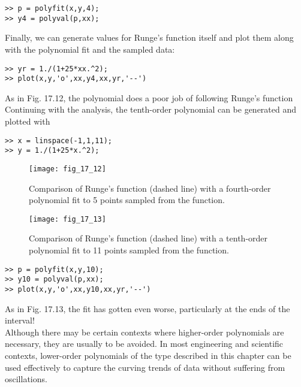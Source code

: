 \documentclass[../main.tex]{subfiles}
\begin{document}
\begin{exmp}
    \begin{lstlisting}[numbers=none]
>> p = polyfit(x,y,4);
>> y4 = polyval(p,xx);
    \end{lstlisting}
    Finally, we can generate values for Runge's function itself and plot them along with the
polynomial fit and the sampled data:
    \begin{lstlisting}[numbers=none]
>> yr = 1./(1+25*xx.^2);
>> plot(x,y,'o',xx,y4,xx,yr,'--')
    \end{lstlisting}
    As in Fig. 17.12, the polynomial does a poor job of following Runge's function\\
    Continuing with the analysis, the tenth-order polynomial can be generated and plotted
with
    \begin{lstlisting}[numbers=none]
>> x = linspace(-1,1,11);
>> y = 1./(1+25*x.^2);
    \end{lstlisting}

    \begin{figure}[H]
        \centering
        \texttt{[image: fig\_17\_12]}
       \caption{\textsf{Comparison of Runge's function (dashed line) with a fourth-order polynomial fit to 5 points
       sampled from the function.}}\label{fig:fig_17_12}
    \end{figure}
    \begin{figure}[H]
        \centering
        \texttt{[image: fig\_17\_13]}
       \caption{\textsf{Comparison of Runge's function (dashed line) with a tenth-order polynomial fit to 11 points
       sampled from the function.}}\label{fig:fig_17_13}
    \end{figure}
    \begin{lstlisting}[numbers=none]
>> p = polyfit(x,y,10);
>> y10 = polyval(p,xx);
>> plot(x,y,'o',xx,y10,xx,yr,'--')
    \end{lstlisting}
    As in Fig. 17.13, the fit has gotten even worse, particularly at the ends of the interval!\\
    Although there may be certain contexts where higher-order polynomials are necessary,
they are usually to be avoided. In most engineering and scientific contexts, lower-order
polynomials of the type described in this chapter can be used effectively to capture the
curving trends of data without suffering from oscillations.
\end{exmp}
\end{document}
